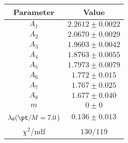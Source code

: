 \begin{tabular}{c|c}
Parameter & Value\\
\hline
$A_1$ & $2.2612\pm0.0022$ \\
$A_2$ & $2.0670\pm0.0029$ \\
$A_3$ & $1.9603\pm0.0042$ \\
$A_4$ & $1.8763\pm0.0055$ \\
$A_5$ & $1.7973\pm0.0079$ \\
$A_6$ & $1.772\pm0.015$ \\
$A_7$ & $1.767\pm0.025$ \\
$A_8$ & $1.677\pm0.040$ \\
$m$ & $0\pm0$ \\
$\lambda_\theta(\pt/M = 7.0$) & $0.136\pm0.013$ \\
\hline
$\chi^2$/ndf & 130/119
\end{tabular}
